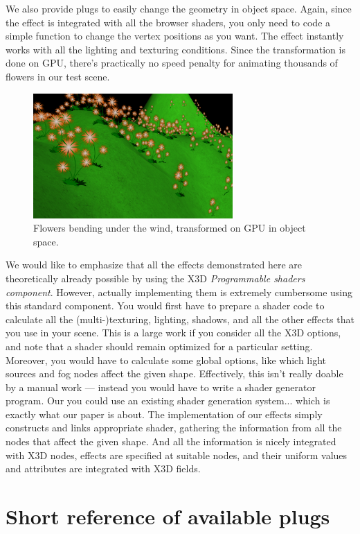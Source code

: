 \documentclass{acmsiggraph}                     %
\begin{document}
We also provide plugs to easily change the geometry in object space.
Again, since the effect is integrated with all the browser shaders,
you only need to code a simple function to change the vertex positions
as you want. The effect instantly works with all the lighting and texturing
conditions. Since the transformation is done on GPU, there's practically
no speed penalty for animating thousands of flowers in our test scene.

\begin{figure}[H]
  \centering
  \includegraphics[width=3in]{flowers}
  \caption{Flowers bending under the wind, transformed on GPU in object space.}
\end{figure}

We would like to emphasize that all the effects demonstrated here
are theoretically already possible by using the X3D \textit{Programmable
shaders component}.
However, actually implementing them is extremely cumbersome using this
standard component. You would first
have to prepare a shader code to calculate all the (multi-)texturing, lighting,
shadows, and all the other effects that you use in your scene.
This is a large work if you consider all the X3D options, and note that
a shader should remain optimized for a particular setting.
Moreover, you would have to calculate some global options,
like which light sources and fog nodes affect the given shape.
Effectively, this isn't really doable by a manual work --- instead
you would have to write a shader generator program. Our you could use
an existing shader generation system... which is exactly what our paper
is about. The implementation of our effects simply constructs and links
appropriate shader, gathering the information from all the nodes
that affect the given shape. And all the information is nicely integrated
with X3D nodes, effects are specified at suitable nodes, and their
uniform values and attributes are integrated with X3D fields.

\section{Short reference of available plugs}
\end{document}
